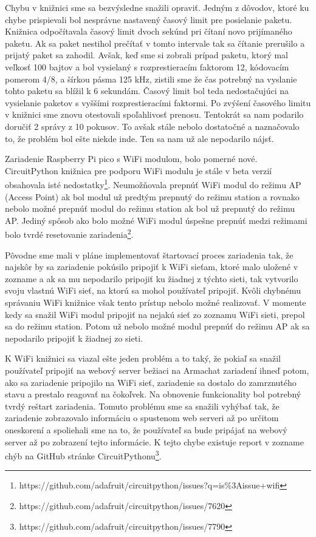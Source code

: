 \documentclass[slovak,master]{diploma}
\begin{document}
Chybu v knižnici sme sa bezvýsledne snažili opraviť. Jedným z dôvodov, ktoré ku chybe prispievali bol nesprávne nastavený časový limit pre posielanie paketu. Knižnica odpočítavala časový limit dvoch sekúnd 
pri čítaní novo prijímaného paketu. Ak sa paket nestihol prečítať v tomto intervale tak sa čítanie prerušilo a prijatý paket sa zahodil. 
Avšak, keď sme si zobrali prípad paketu, ktorý mal veľkosť 100 bajtov a bol vysielaný s rozprestieracím faktorom 12, kódovacím pomerom 4/8, a šírkou pásma 125 kHz, zistili sme 
že čas potrebný na vyslanie tohto paketu sa blížil k 6 sekundám. Časový limit bol teda nedostačujúci na vysielanie paketov s vyššími rozprestieracími faktormi. Po 
zvýšení časového limitu v knižnici sme znovu otestovali spoľahlivosť prenosu. Tentokrát sa nam podarilo doručiť 2 správy z 10 pokusov. To avšak stále nebolo dostatočné a 
naznačovalo to, že problém bol ešte niekde inde. Ten sa nam už ale nepodarilo nájsť.

Zariadenie Raspberry Pi pico s WiFi modulom, bolo pomerné nové. CircuitPython knižnica pre podporu WiFi modulu je stále v beta verzií obsahovala isté nedostatky\footnote[3]{https://github.com/adafruit/circuitpython/issues?q=is\%3Aissue+wifi}.
Neumožňovala prepnúť WiFi modul do režimu AP (Access Point) ak bol modul už predtým prepnutý do režimu station a rovnako nebolo možné prepnúť modul do režimu station ak bol 
už prepnutý do režimu AP. Jediný spôsob ako bolo možné WiFi modul úspešne prepnúť medzi režimami bolo tvrdé resetovanie zariadenia\footnote[4]{https://github.com/adafruit/circuitpython/issues/7620}.

Pôvodne sme mali v pláne implementovať štartovací proces zariadenia tak, že najskôr by sa zariadenie pokúsilo pripojiť k WiFi sieťam, ktoré malo uložené v zozname a ak sa mu nepodarilo 
pripojiť ku žiadnej z týchto sieti, tak vytvorilo svoju vlastnú WiFi sieť, na ktorú sa mohol používateľ pripojiť. Kvôli chybnému správaniu WiFi knižnice však tento prístup nebolo možné 
realizovať. V momente kedy sa snažil WiFi modul pripojiť na nejakú sieť zo zoznamu WiFi sieti, prepol sa do režimu station. Potom už nebolo možné modul prepnúť do režimu AP ak sa nepodarilo pripojiť 
k žiadnej zo sieti.

K WiFi knižnici sa viazal ešte jeden problém a to taký, že pokiaľ sa snažil používateľ pripojiť na webový server bežiaci na Armachat zariadení ihneď potom, ako sa zariadenie pripojilo na WiFi sieť, 
zariadenie sa dostalo do zamrznutého stavu a prestalo reagovať na čokoľvek. Na obnovenie funkcionality bol potrebný tvrdý reštart zariadenia. 
Tomuto problému sme sa snažili vyhýbať tak, že zariadenie zobrazovalo informáciu o spustenom web serveri až po určitom oneskorení a spoliehali sme na to, že používateľ 
sa bude pripájať na webový server až po zobrazení tejto informácie. K tejto chybe existuje report v zozname chýb na GitHub stránke CircuitPythonu\footnote[5]{https://github.com/adafruit/circuitpython/issues/7790}.
\end{document}
